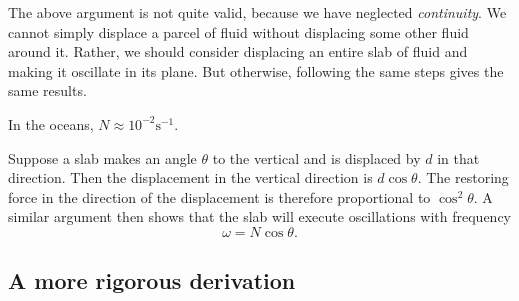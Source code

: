 The above argument is not quite valid, because we have neglected \textit{continuity}. We cannot simply displace a parcel of fluid without displacing some other fluid around it. Rather, we should consider displacing an entire slab of fluid and making it oscillate in its plane. But otherwise, following the same steps gives the same results. 

In the oceans, $N \approx 10^{-2}\mathrm{s^{-1}}$.

Suppose a slab makes an angle $\theta$ to the vertical and is displaced by $d$ in that direction. Then the displacement in the vertical direction is $d\cos\theta$. The restoring force in the direction of the displacement is therefore proportional to $\cos^2\theta$. A similar argument then shows that the slab will execute oscillations with frequency
\begin{equation}
	\omega = N\cos\theta.
	\label{igwdisprel-theta}
\end{equation}

\subsection{A more rigorous derivation}

